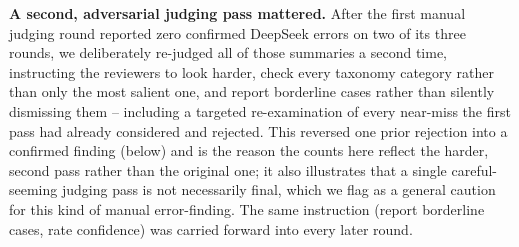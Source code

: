 \documentclass[11pt]{article}
\begin{document}
\textbf{A second, adversarial judging pass mattered.} After the first manual judging round reported zero confirmed DeepSeek errors on two of its three rounds, we deliberately re-judged all of those summaries a second time, instructing the reviewers to look harder, check every taxonomy category rather than only the most salient one, and report borderline cases rather than silently dismissing them -- including a targeted re-examination of every near-miss the first pass had already considered and rejected. This reversed one prior rejection into a confirmed finding (below) and is the reason the counts here reflect the harder, second pass rather than the original one; it also illustrates that a single careful-seeming judging pass is not necessarily final, which we flag as a general caution for this kind of manual error-finding. The same instruction (report borderline cases, rate confidence) was carried forward into every later round.
\end{document}
